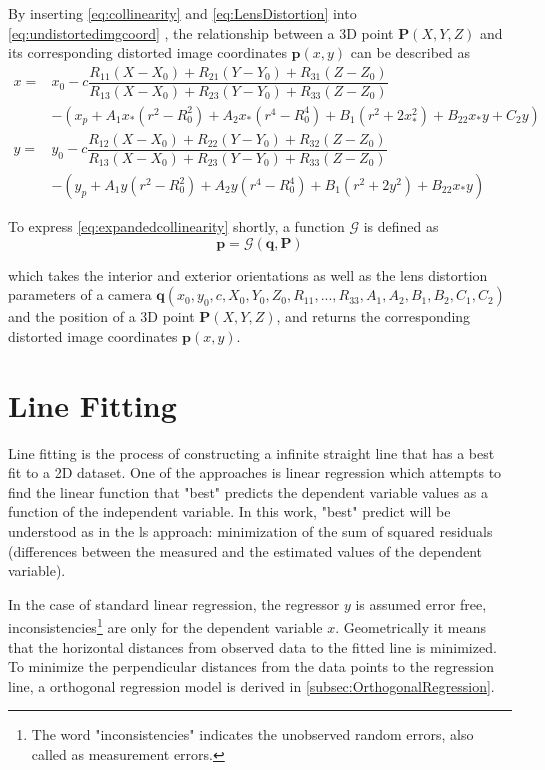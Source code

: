 By inserting \eqref{eq:collinearity} and \eqref{eq:LensDistortion} into \eqref{eq:undistortedimgcoord} , the relationship between a 3D point $\mathbf{P}(X, Y, Z)$ and its corresponding distorted image coordinates $\mathbf{p}(x,y)$ can be described as
\begin{equation} \label{eq:expandedcollinearity}
\begin{split}
x =& x_0-c\dfrac{R_{11}(X-X_0)+R_{21}(Y-Y_0)+R_{31}(Z-Z_0)}{R_{13}(X-X_0)+R_{23}(Y-Y_0)+R_{33}(Z-Z_0)} \\
&-(x_p + A_1x_*(r^2-R_0^2) + A_2x_*(r^4-R_0^4) + B_1(r^2+2x_*^2) + B_22x_*y+C_2y)\\
y =& y_0-c\dfrac{R_{12}(X-X_0)+R_{22}(Y-Y_0)+R_{32}(Z-Z_0)}{R_{13}(X-X_0)+R_{23}(Y-Y_0)+R_{33}(Z-Z_0)} \\
&-(y_p + A_1y  (r^2-R_0^2) + A_2y  (r^4-R_0^4) + B_1(r^2+2y^2)   + B_22x_*y)
\end{split}
\end{equation}

To express \eqref{eq:expandedcollinearity} shortly, a function $\mathcal{G}$ is defined as
\begin{equation} \label{eq:Gfunction}
\mathbf{p} = \mathcal{G}(\mathbf{q},\mathbf{P}) 
\end{equation}

which takes the interior and exterior orientations as well as the lens distortion parameters of a camera $\mathbf{q}(x_0,y_0,c,X_0,Y_0,Z_0,R_{11},...,R_{33},A_1,A_2,B_1,B_2,C_1,C_2)$ and the position of a 3D point $\mathbf{P}(X, Y, Z)$, and returns the corresponding distorted image coordinates $\mathbf{p}(x,y)$.


\section{Line Fitting}
\label{sec:LineFitting}

Line fitting is the process of constructing a infinite straight line that has a best fit to a 2D dataset. One of the approaches is linear regression which attempts to find the linear function that "best" predicts the dependent variable values as a function of the independent variable. In this work, "best" predict will be understood as in the \gls{ls} approach: minimization of the sum of squared residuals (differences between the measured and the estimated values of the dependent variable).

In the case of standard linear regression, the regressor $y$ is assumed error free, inconsistencies\footnote{The word "inconsistencies" indicates the unobserved random errors, also called as measurement errors.} are only for the dependent variable $x$. Geometrically it means that the horizontal distances from observed data to the fitted line is minimized. To minimize the perpendicular distances from the data points to the regression line, a orthogonal regression model is derived in \cref{subsec:OrthogonalRegression}.

